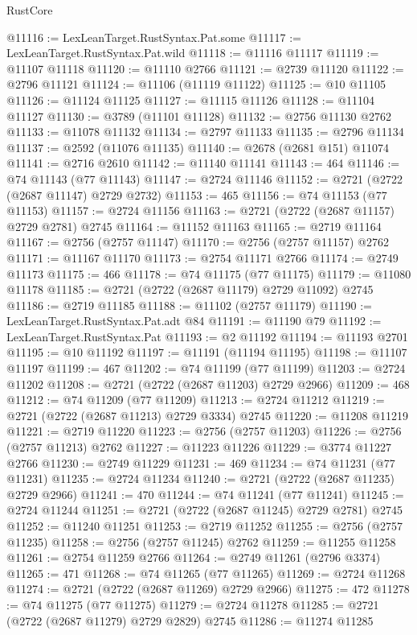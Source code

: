 \begin{lexlean}{RustCore}
\begin{coremodule}
@11116 := LexLeanTarget.RustSyntax.Pat.some
@11117 := LexLeanTarget.RustSyntax.Pat.wild
@11118 := @11116 @11117
@11119 := @11107 @11118
@11120 := @11110 @2766
@11121 := @2739 @11120
@11122 := @2796 @11121
@11124 := @11106 (@11119 @11122)
@11125 := @10 @11105
@11126 := @11124 @11125
@11127 := @11115 @11126
@11128 := @11104 @11127
@11130 := @3789 (@11101 @11128)
@11132 := @2756 @11130 @2762
@11133 := @11078 @11132
@11134 := @2797 @11133
@11135 := @2796 @11134
@11137 := @2592 (@11076 @11135)
@11140 := @2678 (@2681 @151) @11074
@11141 := @2716 @2610
@11142 := @11140 @11141
@11143 := 464
@11146 := @74 @11143 (@77 @11143)
@11147 := @2724 @11146
@11152 := @2721 (@2722 (@2687 @11147) @2729 @2732)
@11153 := 465
@11156 := @74 @11153 (@77 @11153)
@11157 := @2724 @11156
@11163 := @2721 (@2722 (@2687 @11157) @2729 @2781) @2745
@11164 := @11152 @11163
@11165 := @2719 @11164
@11167 := @2756 (@2757 @11147)
@11170 := @2756 (@2757 @11157) @2762
@11171 := @11167 @11170
@11173 := @2754 @11171 @2766
@11174 := @2749 @11173
@11175 := 466
@11178 := @74 @11175 (@77 @11175)
@11179 := @11080 @11178
@11185 := @2721 (@2722 (@2687 @11179) @2729 @11092) @2745
@11186 := @2719 @11185
@11188 := @11102 (@2757 @11179)
@11190 := LexLeanTarget.RustSyntax.Pat.adt @84
@11191 := @11190 @79
@11192 := LexLeanTarget.RustSyntax.Pat
@11193 := @2 @11192
@11194 := @11193 @2701
@11195 := @10 @11192
@11197 := @11191 (@11194 @11195)
@11198 := @11107 @11197
@11199 := 467
@11202 := @74 @11199 (@77 @11199)
@11203 := @2724 @11202
@11208 := @2721 (@2722 (@2687 @11203) @2729 @2966)
@11209 := 468
@11212 := @74 @11209 (@77 @11209)
@11213 := @2724 @11212
@11219 := @2721 (@2722 (@2687 @11213) @2729 @3334) @2745
@11220 := @11208 @11219
@11221 := @2719 @11220
@11223 := @2756 (@2757 @11203)
@11226 := @2756 (@2757 @11213) @2762
@11227 := @11223 @11226
@11229 := @3774 @11227 @2766
@11230 := @2749 @11229
@11231 := 469
@11234 := @74 @11231 (@77 @11231)
@11235 := @2724 @11234
@11240 := @2721 (@2722 (@2687 @11235) @2729 @2966)
@11241 := 470
@11244 := @74 @11241 (@77 @11241)
@11245 := @2724 @11244
@11251 := @2721 (@2722 (@2687 @11245) @2729 @2781) @2745
@11252 := @11240 @11251
@11253 := @2719 @11252
@11255 := @2756 (@2757 @11235)
@11258 := @2756 (@2757 @11245) @2762
@11259 := @11255 @11258
@11261 := @2754 @11259 @2766
@11264 := @2749 @11261 (@2796 @3374)
@11265 := 471
@11268 := @74 @11265 (@77 @11265)
@11269 := @2724 @11268
@11274 := @2721 (@2722 (@2687 @11269) @2729 @2966)
@11275 := 472
@11278 := @74 @11275 (@77 @11275)
@11279 := @2724 @11278
@11285 := @2721 (@2722 (@2687 @11279) @2729 @2829) @2745
@11286 := @11274 @11285

\end{coremodule}
\end{lexlean}
